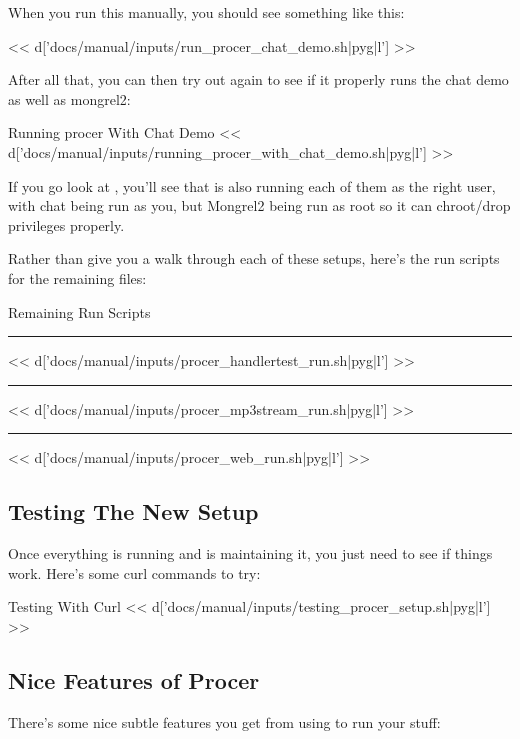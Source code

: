 When you run this manually, you should see something like this:

<< d['docs/manual/inputs/run_procer_chat_demo.sh|pyg|l'] >>

After all that, you can then try out  again to see if it
properly runs the chat demo as well as mongrel2:

\begin{code}{Running procer With Chat Demo}
<< d['docs/manual/inputs/running_procer_with_chat_demo.sh|pyg|l'] >>
\end{code}

If you go look at , you'll see that 
is also running each of them as the right user, with chat being run
as you, but Mongrel2 being run as root so it can chroot/drop privileges properly.

Rather than give you a walk through each of these setups, here's the
run scripts for the remaining files:

\begin{code}{Remaining Run Scripts}
\hrule

<< d['docs/manual/inputs/procer_handlertest_run.sh|pyg|l'] >>

\hrule

<< d['docs/manual/inputs/procer_mp3stream_run.sh|pyg|l'] >>

\hrule

<< d['docs/manual/inputs/procer_web_run.sh|pyg|l'] >>
\end{code}


\subsection{Testing The New Setup}

Once everything is running and  is maintaining it, you
just need to see if things work.  Here's some curl commands to try:

\begin{code}{Testing With Curl}
<< d['docs/manual/inputs/testing_procer_setup.sh|pyg|l'] >>
\end{code}


\subsection{Nice Features of Procer}

There's some nice subtle features you get from using 
to run your stuff:

